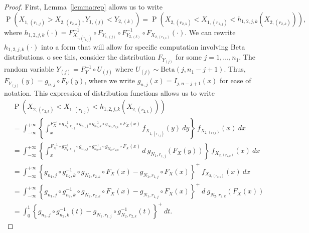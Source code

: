 \documentclass[12pt]{article}
\DeclareMathOperator*{\Prob}{P}
\begin{document}
\begin{proof}
First, Lemma~\ref{lemma:rep} allows us to write
$$
	\Prob\left(X_{1,(r_{1,j})} > X_{2,(r_{2,k})}, Y_{1,(j)} < Y_{2,(k)}\right) = \Prob\left( X_{2,(r_{2,k})} < X_{1,(r_{1,j})}  < h_{1,2,j,k}\left(X_{2,(r_{2,k})}\right)\right),
$$
where $h_{1,2,j,k}(\cdot) = F_{X_{1,(r_{1,j})}}^{-1} \circ F_{Y_{1, (j)}} \circ F_{Y_{2, (k)}}^{-1} \circ F_{X_{2,(r_{2,k})}} (\cdot)$. We can rewrite $h_{1,2,j,k}(\cdot)$ into a form that will allow for specific computation involving Beta distributions. o see this, consider the distribution $F_{Y_{(j)}}$ for some $j = 1,\ldots,n_1$. The random variable $Y_{(j)} = F_Y^{-1} \circ U_{(j)}$ where $U_{(j)} \sim \text{Beta}(j,n_1-j+1)$. Thus, $F_{Y_{(j)}}(y) = g_{n,j} \circ F_Y (y)$,
where we write $g_{n,j}(x) = I_{j, n-j+1}(x)$ for ease of notation. This expression of distribution functions allows us to write 
\begin{align*}
	&\Prob\left( X_{2,(r_{2,k})} < X_{1,(r_{1,j})}  < h_{1,2,j,k}\left(X_{2,(r_{2,k})}\right)\right) \\
	&= \int_{-\infty}^{+\infty}\left\{\int_{x}^{F_X^{-1} \circ g_{N_1,r_{1,j}}^{-1} \circ g_{n_1, j} \circ g_{n_2,k}^{-1} \circ g_{N_2,r_{2,k}} \circ F_X(x)} f_{X_{1,(r_{1,j})}}(y)\ dy\right\} \ f_{X_{2,(r_{2,k})}}(x) \ dx \\
	&= \int_{-\infty}^{+\infty}\left\{\int_{x}^{F_X^{-1} \circ g_{N_1,r_{1,j}}^{-1} \circ g_{n_1, j} \circ g_{n_2,k}^{-1} \circ g_{N_2,r_{2,k}} \circ F_X(x)} d \ g_{N_1, r_{1,j}}(F_X(y))\right\} \ f_{X_{2,(r_{2,k})}}(x) \ dx \\
	&= \int_{-\infty}^{+\infty}\left\{g_{n_1, j} \circ g_{n_2, k}^{-1} \circ g_{N_2, r_{2,k}} \circ F_X(x) - g_{N_1, r_{1,j}} \circ F_X(x)\right\}^+ \ f_{X_{2,(r_{2,k})}}(x) \ dx \\
	&= \int_{-\infty}^{+\infty}\left\{g_{n_1, j} \circ g_{n_2, k}^{-1} \circ g_{N_2, r_{2,k}} \circ F_X(x) - g_{N_1, r_{1,j}} \circ F_X(x)\right\}^+ \  d \ g_{N_2, r_{2,k}}(F_X(x)) \\
	&= \int_0^1 \left\{g_{n_1, j} \circ g_{n_2, k}^{-1}(t) - g_{N_1, r_{1,j}} \circ g_{N_2, r_{2,k}}^{-1}(t)\right\}^+	 \ dt.
\end{align*}

\end{proof}
\end{document}
